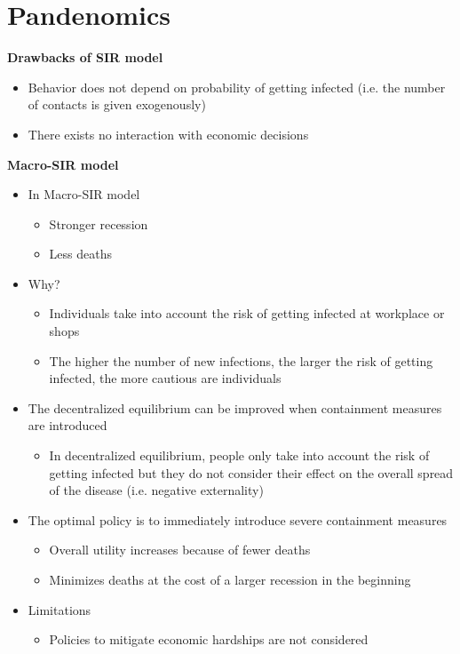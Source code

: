 \documentclass[a4paper]{article}
\begin{document}
\section{Pandenomics}
\textbf{Drawbacks of SIR model}
\begin{itemize}
    \item Behavior does not depend on probability of getting infected (i.e. the number of contacts is given exogenously)
    \item There exists no interaction with economic decisions
\end{itemize}
\textbf{Macro-SIR model}
\begin{itemize}
    \item In Macro-SIR model
    \begin{itemize}
        \item Stronger recession
        \item Less deaths
    \end{itemize}
    \item Why?
    \begin{itemize}
        \item Individuals take into account the risk of getting infected at workplace or shops
        \item The higher the number of new infections, the larger the risk of getting infected, the more cautious are individuals
    \end{itemize}
    \item The decentralized equilibrium can be improved when containment measures are introduced
    \begin{itemize}
        \item In decentralized equilibrium, people only take into account the risk of getting infected but they do not consider their effect on the overall spread of the disease (i.e. negative externality)
    \end{itemize}
    \item The optimal policy is to immediately introduce severe containment measures
    \begin{itemize}
        \item Overall utility increases because of fewer deaths
        \item Minimizes deaths at the cost of a larger recession in the beginning
    \end{itemize}
    \item Limitations
    \begin{itemize}
        \item Policies to mitigate economic hardships are not considered

\end{itemize}
\end{itemize}
\end{document}
